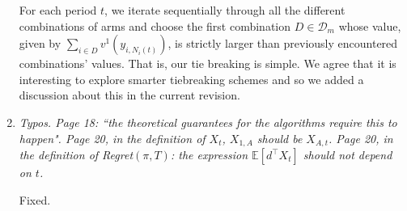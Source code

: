 \documentclass[11pt]{article}
\newcommand{\1}{\ensuremath{\mathbf{1}}} %
\theoremstyle{thm-sf}
\begin{document}
\begin{enumerate}
		For each period $t$, we iterate sequentially through all the different combinations of arms and choose the first combination $D \in \mathcal D_m$ whose value, given by $\sum_{i \in D} v^1(y_{i,N_i(t)})$, is strictly larger than previously encountered combinations' values. That is, our tie breaking is simple.
		We agree that it is interesting to explore smarter tiebreaking schemes and so we added a discussion about this in the current revision.
			
		\item {\it Typos. Page 18: ``the theoretical guarantees for the algorithms require this to happen". Page
		20, in the definition of $X_t$, $X_{1,A}$ should be $X_{A,t}$. Page 20, in the definition of Regret$(\pi,T)$: the expression $\mathbb{E}[d^\top X_t]$ should not depend on $t$.}
	
		Fixed.
	\end{enumerate}
	



 
\end{document}
